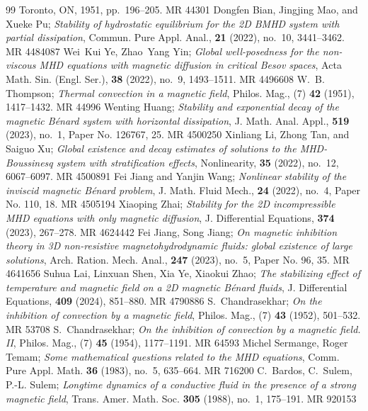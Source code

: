 \documentclass[10pt,a4paper]{amsart}
\numberwithin{equation}{section}
\begin{document}
\begin{thebibliography}{99}
 Toronto, ON, 1951, pp.~196--205. MR {44301}
Dongfen Bian, Jingjing Mao, and Xueke Pu; 
\emph{Stability of hydrostatic
 equilibrium for the 2{D} {BMHD} system with partial dissipation}, Commun.
 Pure Appl. Anal., \textbf{21} (2022), no.~10, 3441--3462. MR {4484087}
Wei~Kui Ye, Zhao~Yang Yin; 
\emph{Global well-posedness for the non-viscous
 {MHD} equations with magnetic diffusion in critical {B}esov spaces}, Acta
 Math. Sin. (Engl. Ser.), \textbf{38} (2022), no.~9, 1493--1511. MR {4496608}
W.~B. Thompson; 
\emph{Thermal convection in a magnetic field}, Philos. Mag., (7)
 \textbf{42} (1951), 1417--1432. MR {44996}
Wenting Huang; 
\emph{Stability and exponential decay of the magnetic
 {B}\'enard system with horizontal dissipation}, J. Math. Anal. Appl.,
 \textbf{519} (2023), no.~1, Paper No. 126767, 25. MR {4500250}
Xinliang Li, Zhong Tan, and Saiguo Xu; 
\emph{Global existence and decay  estimates of solutions to the 
{MHD}-{B}oussinesq system with stratification
 effects}, Nonlinearity, \textbf{35} (2022), no.~12, 6067--6097. MR {4500891}
Fei Jiang and Yanjin Wang; 
\emph{Nonlinear stability of the inviscid magnetic
 {B}\'enard problem}, J. Math. Fluid Mech., \textbf{24} (2022), no.~4, Paper
 No. 110, 18. MR {4505194}
Xiaoping Zhai; 
\emph{Stability for the 2{D} incompressible {MHD} equations with
 only magnetic diffusion}, J. Differential Equations, \textbf{374} (2023),
 267--278. MR {4624442}
Fei Jiang, Song Jiang; 
\emph{On magnetic inhibition theory in 3{D} non-resistive
 magnetohydrodynamic fluids: global existence of large solutions}, Arch.
 Ration. Mech. Anal., \textbf{247} (2023), no.~5, Paper No. 96, 35.
 MR {4641656}
Suhua Lai, Linxuan Shen, Xia Ye, Xiaokui Zhao; 
\emph{The stabilizing effect  of temperature and magnetic field on a 2{D} 
magnetic {B}\'enard fluids}, J.
 Differential Equations, \textbf{409} (2024), 851--880. MR {4790886}
S.~Chandrasekhar; 
\emph{On the inhibition of convection by a magnetic field},
 Philos. Mag., (7) \textbf{43} (1952), 501--532. MR {53708}
S.~Chandrasekhar; 
\emph{On the inhibition of convection by a magnetic field. {II}},
 Philos. Mag., (7) \textbf{45} (1954), 1177--1191. MR {64593}
Michel Sermange, Roger Temam; 
\emph{Some mathematical questions related to
 the {MHD} equations}, Comm. Pure Appl. Math. \textbf{36} (1983), no.~5,
 635--664. MR {716200}
C.~Bardos, C.~Sulem, P.-L. Sulem; 
\emph{Longtime dynamics of a conductive
 fluid in the presence of a strong magnetic field}, Trans. Amer. Math. Soc.
 \textbf{305} (1988), no.~1, 175--191. MR {920153}
\end{thebibliography}
\end{document}
